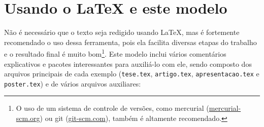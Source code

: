 
\chapter{Usando o \LaTeX{} e este modelo}

Não é necessário que o texto seja redigido usando \LaTeX{}, mas é fortemente
recomendado o uso dessa ferramenta, pois ela facilita diversas etapas do
trabalho e o resultado final é muito bom\footnote{O uso de um sistema de
controle de versões, como mercurial (\url{mercurial-scm.org}) ou git
(\url{git-scm.com}), também é altamente recomendado.}. Este modelo inclui
vários comentários explicativos e pacotes interessantes para auxiliá-lo com
ele, sendo composto dos arquivos principais de cada exemplo
(\texttt{tese.tex}, \texttt{artigo.tex},
\texttt{apresentacao.tex} e \texttt{poster.tex}) e de
vários arquivos auxiliares:

